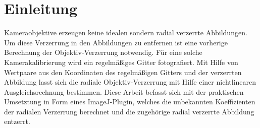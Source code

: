 \section{Einleitung}\label{sec:Introduction}


Kameraobjektive erzeugen keine idealen sondern radial verzerrte Abbildungen. Um diese Verzerrung in den Abbildungen zu entfernen ist eine vorherige Berechnung der Objektiv-Verzerrung notwendig. 
Für eine solche Kamerakalibrierung wird ein regelmäßiges Gitter fotografiert. 
Mit Hilfe von Wertpaare aus den Koordinaten des regelmäßigen Gitters und der verzerrten Abbildung lasst sich die radiale Objektiv-Verzerrung mit Hilfe einer nichtlinearen Ausgleichsrechnung bestimmen. 
Diese Arbeit befasst sich mit der praktischen Umsetztung in Form eines ImageJ-Plugin, welches die unbekannten Koeffizienten der radialen Verzerrung berechnet und die zugehörige radial verzerrte Abbildung entzerrt.
























